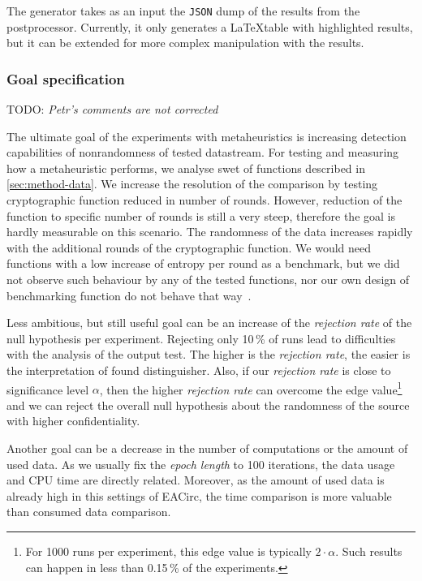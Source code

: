 \documentclass[
  print, %
  Table,   %
  nolof,     %
  nolot,     %
  11pt, %
  oneside  %
]{fithesis3}
\newcommand{\todo}[1]{TODO: \textit{#1}}
\begin{document}
The generator takes as an input the \texttt{JSON} dump of the results from the postprocessor. Currently, it only generates a \LaTeX table with highlighted results, but it can be extended for more complex manipulation with the results.

\subsubsection{\textbf{Goal specification}}
\label{subsubsec:method-spec-ss-goal}

\todo{Petr's comments are not corrected}

The ultimate goal of the experiments with metaheuristics is increasing detection capabilities of nonrandomness of tested datastream. For testing and measuring how a metaheuristic performs, we analyse swet of functions described in \cref{sec:method-data}. We increase the resolution of the comparison by testing cryptographic function reduced in number of rounds. However, reduction of the function to specific number of rounds is still a very steep, therefore the goal is hardly measurable on this scenario. The randomness of the data increases rapidly with the additional rounds of the cryptographic function. We would need functions with a low increase of entropy per round as a benchmark, but we did not observe such behaviour by any of the tested functions, nor our own design of benchmarking function do not behave that way~\cite{EACirc-lut}.

Less ambitious, but still useful goal can be an increase of the \textit{rejection rate} of the null hypothesis per experiment. Rejecting only 10\,\% of runs lead to difficulties with the analysis of the output test. The higher is the \textit{rejection rate}, the easier is the interpretation of found distinguisher. Also, if our \textit{rejection rate} is close to significance level $\alpha$, then the higher \textit{rejection rate} can overcome the edge value\footnote{For 1000 runs per experiment, this edge value is typically $2\cdot\alpha$. Such results can happen in less than 0.15\,\% of the experiments.} and we can reject the overall null hypothesis about the randomness of the source with higher confidentiality.

Another goal can be a decrease in the number of computations or the amount of used data. As we usually fix the \textit{epoch length} to 100 iterations, the data usage and CPU time are directly related. Moreover, as the amount of used data is already high in this settings of EACirc, the time comparison is more valuable than consumed data comparison.
\end{document}
